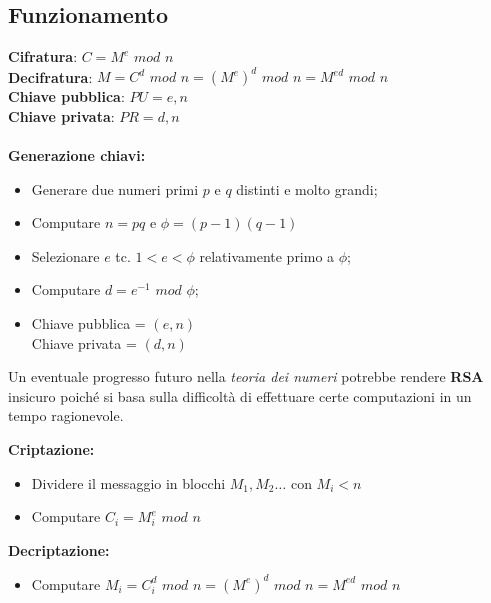 \documentclass[11pt, a4paper, twoside, italian]{report}
\theoremstyle{plain}
\begin{document}
\subsection*{Funzionamento}
\textbf{Cifratura}: $C = M^{e}$ $mod$ $n$ \\
\textbf{Decifratura}: $M = C^{d}$ $mod$ $n = (M^{e})^{d}$ $mod$ $n = M^{ed}$ $mod$ $n$ \\
\textbf{Chiave pubblica}: $PU = {e,n}$\\
\textbf{Chiave privata}: $PR = {d,n}$\\
~\\
\textbf{Generazione chiavi:}
\begin{itemize}
	\item Generare due numeri primi $p$ e $q$ distinti e molto grandi;
	\item Computare $n = pq$ e $\phi = (p-1)(q-1)$
	\item Selezionare $e$ tc. $1 < e < \phi$ relativamente primo a $\phi$;
	\item Computare $d = e^{-1}$ $mod$ $\phi$;
	\item Chiave pubblica = $(e, n)$\\
	Chiave privata = $(d, n)$
\end{itemize}
\noindent
Un eventuale progresso futuro nella \textit{teoria dei numeri} potrebbe rendere \textbf{RSA} insicuro poiché si basa sulla difficoltà di effettuare certe computazioni in un tempo ragionevole.
\begin{multicols}{2}
\noindent
\textbf{Criptazione:}
\begin{itemize}
	\item Dividere il messaggio in blocchi $M_{1}, M_{2} \dots$ con $M_{i} < n$
	\item Computare $C_{i} = M_{i}^{e}$ $mod$ $n$
\end{itemize}
\columnbreak
\noindent
\textbf{Decriptazione:}
\begin{itemize}
	\item Computare $M_{i} = C_{i}^{d}$ $mod$ $n = (M^e)^d$ $mod$ $n = M^{ed}$ $mod$ $n$
	\newline
	\newline
\end{itemize}
\end{multicols}
\end{document}
